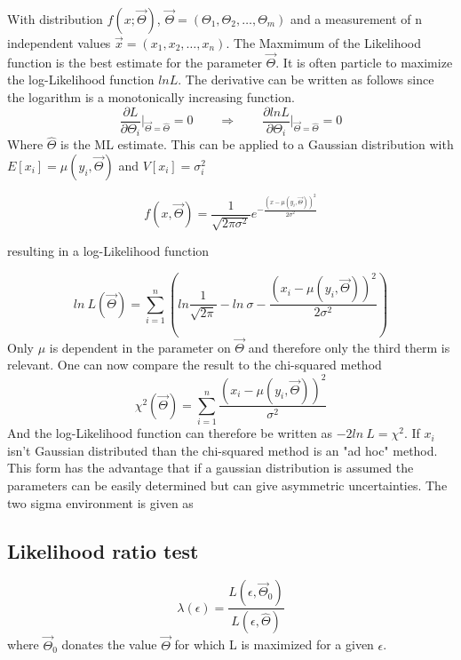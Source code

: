 \documentclass[../Bachelorarbeit.tex]{subfiles}
\begin{document}
With distribution $f(x;\overrightarrow{\Theta})$, $\overrightarrow{\Theta} = (\Theta_{1},\Theta_{2},\dots,\Theta_{m})$ and a measurement of n independent values $\overrightarrow{x}=(x_{1},x_{2},\dots,x_{n})$.
The Maxmimum of the Likelihood function is the best estimate for the parameter $\overrightarrow{\Theta}$.
It is often particle to maximize the log-Likelihood function $ln L$. The derivative can be written as follows since the logarithm is a monotonically increasing function.
\begin{equation}
    \frac{\partial L}{\partial \Theta_{i}} \bigg \vert_{\overrightarrow{\Theta}=\hat{\Theta}} = 0 \qquad \Longrightarrow \qquad \frac{\partial ln L}{\partial \Theta_{i}} \bigg \vert_{\overrightarrow{\Theta}=\hat{\Theta}}=0
\end{equation}
Where $\hat{\Theta}$ is the ML estimate. This can be applied to a Gaussian distribution with $E[x_{i}]=\mu(y_{i},\overrightarrow{\Theta})$ and $V[x_{i}]=\sigma_{i}^{2}$

\begin{equation}
    f(x,\overrightarrow{\Theta}) = \frac{1}{\sqrt{2\pi \sigma^{2}}} e^{-\frac{(x-\mu(y_{i},\overrightarrow{\Theta}))^{2}}{2 \sigma^{2}}}
\end{equation}

resulting in a log-Likelihood function

\begin{equation}
    ln \: L(\overrightarrow{\Theta}) = \sum^{n}_{i=1} \left( ln \frac{1}{\sqrt{2\pi}}-ln \: \sigma - \frac{(x_{i} - \mu(y_{i},\overrightarrow{\Theta}))^2}{2 \sigma^{2}}\right)
\end{equation}
Only $\mu$ is dependent in the parameter on $\overrightarrow{\Theta}$ and therefore only the third therm is relevant. One can now compare the result to the chi-squared method
\begin{equation}
    \chi^{2}(\overrightarrow{\Theta}) = \sum^{n}_{i=1} \frac{(x_{i} - \mu(y_{i},\overrightarrow{\Theta}))^2}{\sigma^{2}}
\end{equation}
And the log-Likelihood function can therefore be written as $-2 ln \: L = \chi^{2}$. If $x_{i}$ isn't Gaussian distributed than the chi-squared method is an "ad hoc" method.
This form has the advantage that if a gaussian distribution is assumed the parameters can be easily determined but can give asymmetric uncertainties.
The two sigma environment is given as

\subsection{Likelihood ratio test}

\begin{equation}
    \lambda(\epsilon) = \frac{L(\epsilon,\overrightarrow{\Theta}_{0})}{L(\epsilon,\hat{\Theta})}
\end{equation}
where $\overrightarrow{\Theta}_{0}$ donates the value $\overrightarrow{\Theta}$ for which L is maximized for a given $\epsilon$.
\end{document}
